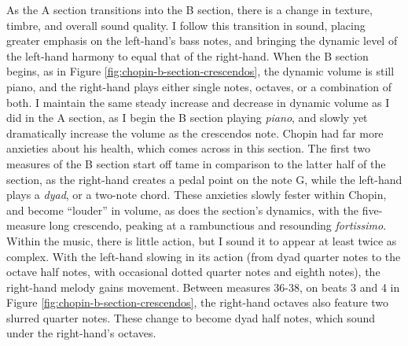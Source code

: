 As the A section transitions into the B section, there is a change in texture, timbre, and overall sound quality. I follow this transition in sound, placing greater emphasis on the left-hand's bass notes, and bringing the dynamic level of the left-hand harmony to equal that of the right-hand. When the B section begins, as in Figure \ref{fig:chopin-b-section-crescendos}\autocite{Hansen_1973}, the dynamic volume is still piano, and the right-hand plays either single notes, octaves, or a combination of both. I maintain the same steady increase and decrease in dynamic volume as I did in the A section, as I begin the B section playing \textit{piano}, and slowly yet dramatically increase the volume as the crescendos note. Chopin had far more anxieties about his health, which comes across in this section. The first two measures of the B section start off tame in comparison to the latter half of the section, as the right-hand creates a pedal point on the note G\musSharp{}, while the left-hand plays a \textit{dyad}, or a two-note chord. These anxieties slowly fester within Chopin, and become ``louder'' in volume, as does the section's dynamics, with the five-measure long crescendo, peaking at a rambunctious and resounding \textit{fortissimo}. Within the music, there is little action, but I sound it to appear at least twice as complex. With the left-hand slowing in its action (from dyad quarter notes to the octave half notes, with occasional dotted quarter notes and eighth notes), the right-hand melody gains movement. Between measures 36-38, on beats 3 and 4 in Figure \ref{fig:chopin-b-section-crescendos}\autocite{Hansen_1973}, the right-hand octaves also feature two slurred quarter notes. These change to become dyad half notes, which sound under the right-hand's octaves. 


